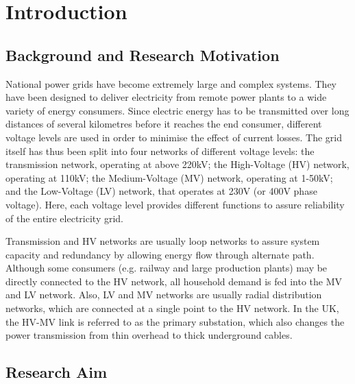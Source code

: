 \chapter{Introduction}
\label{ch-introduction}



\section{Background and Research Motivation}
\label{ch-introduction:sec:background-and-research-motivation}

National power grids have become extremely large and complex systems. They have been designed to deliver electricity from remote power plants to a wide variety of energy consumers. Since electric energy has to be transmitted over long distances of several kilometres before it reaches the end consumer, different voltage levels are used in order to minimise the effect of current losses. The grid itself has thus been split into four networks of different voltage levels: the transmission network, operating at above 220kV; the High-Voltage (HV) network, operating at 110kV; the Medium-Voltage (MV) network, operating at 1-50kV; and the Low-Voltage (LV) network, that operates at 230V (or 400V phase voltage). Here, each voltage level provides different functions to assure reliability of the entire electricity grid.

Transmission and HV networks are usually loop networks to assure system capacity and redundancy by allowing energy flow through alternate path. Although some consumers (e.g. railway and large production plants) may be directly connected to the HV network, all household demand is fed into the MV and LV network. Also, LV and MV networks are usually radial distribution networks, which are connected at a single point to the HV network. In the UK, the HV-MV link is referred to as the primary substation, which also changes the power transmission from thin overhead to thick underground cables.


\section{Research Aim}
\label{ch-introduction:sec:research-aim}


